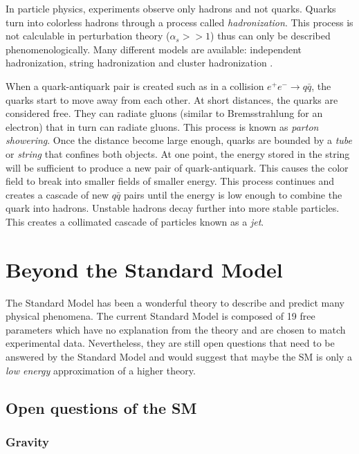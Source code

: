 In particle physics, experiments observe only hadrons and not quarks. Quarks turn into colorless hadrons through a process called \textit{hadronization}. This process is not calculable in perturbation theory ($\alpha_s >> 1$) thus can only be described phenomenologically. Many different models are available: independent hadronization, string hadronization \cite{Artru1988} and cluster hadronization \cite{Webber:1983if}.

When a quark-antiquark pair is created such as in a collision $e^+e^- \rightarrow q\bar{q}$, the quarks start to move away from each other. At short distances, the quarks are considered free. They can radiate gluons (similar to Bremsstrahlung for an electron) that in turn can radiate gluons. This process is known as \textit{parton showering}. Once the distance become large enough, quarks are bounded by a \textit{tube} or \textit{string} that confines both objects. At one point, the energy stored in the string will be sufficient to produce a new pair of quark-antiquark. This causes the color field to break into smaller fields of smaller energy. This process continues and creates a cascade of new $q\bar{q}$ pairs until the energy is low enough to combine the quark into hadrons. Unstable hadrons decay further into more stable particles. This creates a collimated cascade of particles known as a \textit{jet}.

\section{Beyond the Standard Model}
\label{sec:BeyondSM}

The Standard Model has been a wonderful theory to describe and predict many physical phenomena. The current Standard Model is composed of 19 free parameters which have no explanation from the theory and are chosen to match experimental data. Nevertheless, they are still open questions that need to be answered by the Standard Model and would suggest that maybe the SM is only a \textit{low energy} approximation of a higher theory.

\subsection{Open questions of the SM}

\subsubsection*{Gravity}

